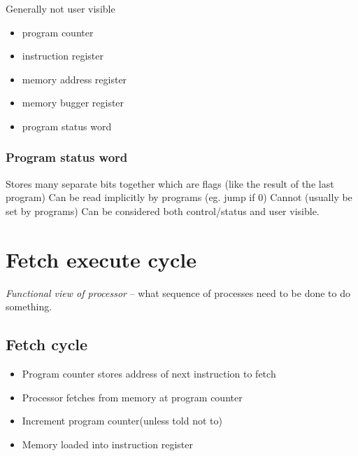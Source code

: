 Generally not user visible
\begin{itemize}
	\item program counter
	\item instruction register
	\item  memory address register
	\item memory bugger register
	\item program status word
\end{itemize}

\subsubsection{Program status word}\label{ssub:program_status_word}

Stores many separate bits together which are flags (like the result of the last program)
Can be read implicitly by programs (eg. jump if \(0\))
Cannot (usually be set by programs)
Can be considered both control/status and user visible.

\section{Fetch execute cycle}\label{sec:fetch_execute_cycle}

\emph{Functional view of processor} -- what sequence of processes need to be done to do something.

\subsection{Fetch cycle}\label{sub:fetch_cycle}

\begin{itemize}
	\item Program counter stores address of next instruction to fetch
	\item Processor fetches from memory at program counter
	\item Increment program counter(unless told not to)
	\item Memory loaded into instruction register
\end{itemize}
